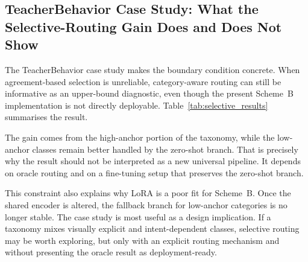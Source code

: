 \documentclass{ieeeaccess}
\begin{document}
\subsection{TeacherBehavior Case Study: What the Selective-Routing
Gain Does and Does Not Show}

The TeacherBehavior case study makes the boundary condition concrete.
When agreement-based selection is unreliable, category-aware routing
can still be informative as an upper-bound diagnostic, even though the
present Scheme~B implementation is not directly deployable.
Table~\ref{tab:selective_results} summarises the result.

\begin{table}[!ht]
\caption{Comparison of annotation strategies on TeacherBehavior
(validation accuracy, \%). The selective strategy uses pseudo-labels
for high-anchor classes and zero-shot CLIP for low-anchor classes.
High-anchor: blackboard-writing, teacher, screen, blackboard.
Low-anchor: guide, answer, on-stage interaction, stand.
The zero-shot baseline in this table uses the prompt-ensemble setting.
\textbf{Selective routing uses ground-truth category as oracle routing
variable at evaluation time and represents a diagnostic upper bound,
not a deployable pipeline or a deployable-method comparison.}}
\label{tab:selective_results}
\centering
{}
\end{table}

The gain comes from the high-anchor portion of the taxonomy, while the
low-anchor classes remain better handled by the zero-shot branch.
That is precisely why the result should not be interpreted as a new
universal pipeline.
It depends on oracle routing and on a fine-tuning setup that preserves
the zero-shot branch.

This constraint also explains why LoRA is a poor fit for Scheme~B.
Once the shared encoder is altered, the fallback branch for low-anchor
categories is no longer stable.
The case study is most useful as a design implication.
If a taxonomy mixes visually explicit and intent-dependent classes,
selective routing may be worth exploring, but only with an explicit
routing mechanism and without presenting the oracle result as
deployment-ready.
\end{document}
